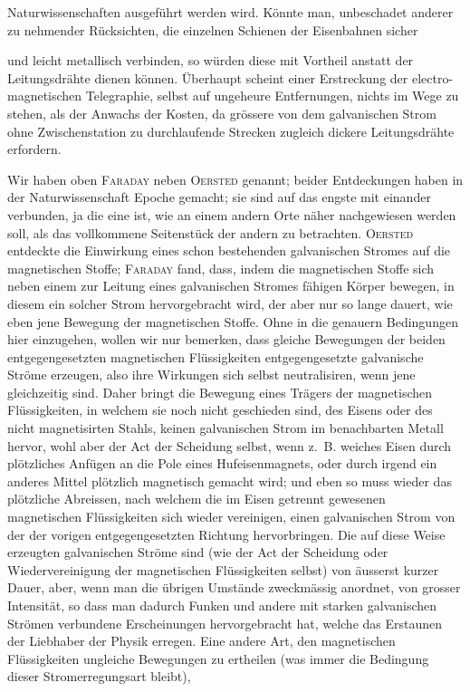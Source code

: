 Naturwissenschaften ausgeführt werden wird. Könnte man, unbeschadet anderer zu nehmender Rücksichten, die einzelnen Schienen der Eisenbahnen sicher
\par\clearpage
{}
\noindent und leicht metallisch verbinden, so würden diese mit Vortheil anstatt der Leitungsdrähte dienen können. Überhaupt scheint einer Erstreckung der electro-magnetischen Telegraphie, selbst auf ungeheure Entfernungen, nichts im Wege zu stehen, als der Anwachs der Kosten, da grössere von dem galvanischen Strom ohne Zwischenstation zu durchlaufende Strecken zugleich dickere Leitungsdrähte erfordern.

Wir haben oben \textsc{Faraday} neben \textsc{Oersted} genannt; beider Entdeckungen haben in der Naturwissenschaft Epoche gemacht; sie sind auf das engste mit einander verbunden, ja die eine ist, wie an einem andern Orte näher nachgewiesen werden soll, als das vollkommene Seitenstück der andern zu betrachten. \textsc{Oersted} entdeckte die Einwirkung eines schon bestehenden galvanischen Stromes auf die magnetischen Stoffe; \textsc{Faraday} fand, dass, indem die magnetischen Stoffe sich neben einem zur Leitung eines galvanischen Stromes fähigen Körper bewegen, in diesem ein solcher Strom hervorgebracht wird, der aber nur so lange dauert, wie eben jene Bewegung der magnetischen Stoffe. Ohne in die genauern Bedingungen hier einzugehen, wollen wir nur bemerken, dass gleiche Bewegungen der beiden entgegengesetzten magnetischen Flüssigkeiten entgegengesetzte galvanische Ströme erzeugen, also ihre Wirkungen sich selbst neutralisiren, wenn jene gleichzeitig sind. Daher bringt die Bewegung eines Trägers der magnetischen Flüssigkeiten, in welchem sie noch nicht geschieden sind, des Eisens oder des nicht magnetisirten Stahls, keinen galvanischen Strom im benachbarten Metall hervor, wohl aber der Act der Scheidung selbst, wenn z.~B. weiches Eisen durch plötzliches Anfügen an die Pole eines Hufeisenmagnets, oder durch irgend ein anderes Mittel plötzlich magnetisch gemacht wird; und eben so muss wieder das plötzliche Abreissen, nach welchem die im Eisen getrennt gewesenen magnetischen Flüssigkeiten sich wieder vereinigen, einen galvanischen Strom von der der vorigen entgegengesetzten Richtung hervorbringen. Die auf diese Weise erzeugten galvanischen Ströme sind (wie der Act der Scheidung oder Wiedervereinigung der magnetischen Flüssigkeiten selbst) von äusserst kurzer Dauer, aber, wenn man die übrigen Umstände zweckmässig anordnet, von grosser Intensität, so dass man dadurch Funken und andere mit starken galvanischen Strömen verbundene Erscheinungen hervorgebracht hat, welche das Erstaunen der Liebhaber der Physik erregen. Eine andere Art, den magnetischen Flüssigkeiten ungleiche Bewegungen zu ertheilen (was immer die Bedingung dieser Stromerregungsart bleibt),
